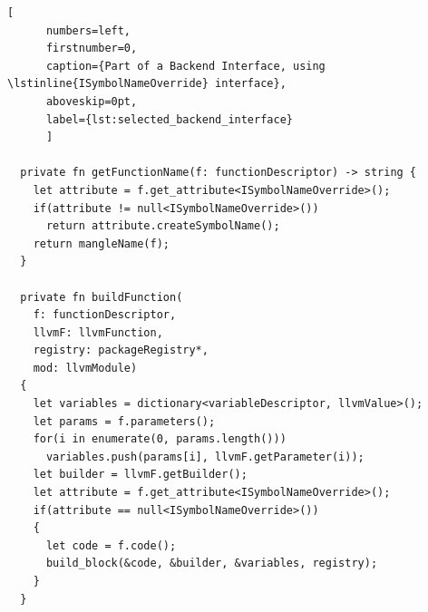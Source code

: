 \begin{minipage}{\linewidth}

	\begin{lstlisting}[
	  numbers=left,
	  firstnumber=0,
	  caption={Part of a Backend Interface, using \lstinline{ISymbolNameOverride} interface},
	  aboveskip=0pt,
	  label={lst:selected_backend_interface}
	  ]

  private fn getFunctionName(f: functionDescriptor) -> string {
	let attribute = f.get_attribute<ISymbolNameOverride>();
	if(attribute != null<ISymbolNameOverride>())
	  return attribute.createSymbolName();
	return mangleName(f);
  }

  private fn buildFunction(
	f: functionDescriptor,
	llvmF: llvmFunction,
	registry: packageRegistry*,
	mod: llvmModule)
  {
	let variables = dictionary<variableDescriptor, llvmValue>();
	let params = f.parameters();
	for(i in enumerate(0, params.length()))
	  variables.push(params[i], llvmF.getParameter(i));
	let builder = llvmF.getBuilder();
	let attribute = f.get_attribute<ISymbolNameOverride>();
	if(attribute == null<ISymbolNameOverride>())
	{
	  let code = f.code();
	  build_block(&code, &builder, &variables, registry);
	}
  }

  \end{lstlisting}
\end{minipage}


